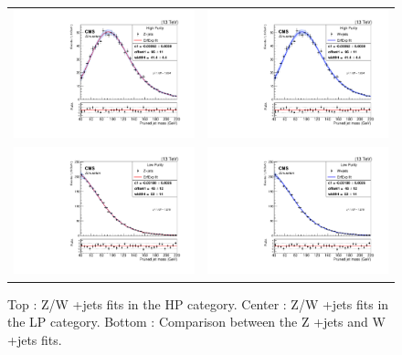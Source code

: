 \begin{figure}[!ht]
\caption{ Top : Z/W +jets fits in the HP category. Center : Z/W +jets fits in the LP category. Bottom : Comparison between the Z +jets and W +jets fits.}
\begin{tabular}{cc}
  \includegraphics[width=220pt]{figuresARC/Vjets/ZjetsHP.pdf} &
\includegraphics[width=220pt]{figuresARC/Vjets/WjetsHP.pdf}\\
  \includegraphics[width=220pt]{figuresARC/Vjets/ZjetsLP.pdf} &
\includegraphics[width=220pt]{figuresARC/Vjets/WjetsLP.pdf}\\

\end{tabular}
\end{figure}
